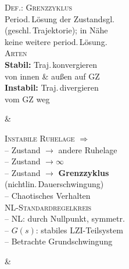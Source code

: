 

\begin{formelreihe}
  \parbox[t]{\linewidth}{%
    {\scriptsize\scshape\color{gray!65!black} Def.: Grenzzyklus}\\[0.03em]%
    \scriptsize
    Period.\,Lösung der Zustandsgl.\\
    (geschl.\,Trajektorie); in Nähe\\
    keine weitere period.\,Lösung.\\[0.06em]
    {\scriptsize\scshape\color{gray!65!black} Arten}\\[0.03em]%
    \textbf{Stabil:} Traj.\,konvergieren\\
    von innen \& außen auf GZ\\[0.03em]
    \textbf{Instabil:} Traj.\,divergieren\\
    vom GZ weg} &
  \parbox[t]{\linewidth}{%
    {\scriptsize\scshape\color{gray!65!black} Instabile Ruhelage $\Rightarrow$}\\[0.03em]%
    \scriptsize
    – Zustand $\to$ andere Ruhelage\\[0.02em]
    – Zustand $\to\infty$\\[0.02em]
    – Zustand $\to$ \textbf{Grenzzyklus}\\
    \quad(nichtlin.\,Dauerschwingung)\\[0.02em]
    – Chaotisches Verhalten\\[0.06em]
    {\scriptsize\scshape\color{gray!65!black} NL-Standardregelkreis}\\[0.03em]%
    \scriptsize
    – NL: durch Nullpunkt, symmetr.\\
    – $G(s)$: stabiles LZI-Teilsystem\\
    – Betrachte Grundschwingung} &
   \\[0.3em]
\end{formelreihe}
\bereichende

